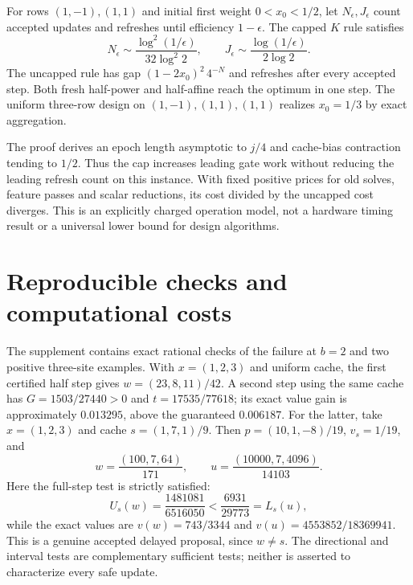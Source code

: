 \documentclass[11pt]{article}
\begin{document}
\begin{proposition}\label{prop:cap-cost}
For rows $(1,-1),(1,1)$ and initial first weight $0<x_0<1/2$, let $N_\epsilon,J_\epsilon$ count accepted updates and refreshes until efficiency $1-\epsilon$. The capped $K$ rule satisfies
\[
 N_\epsilon\sim\frac{\log^2(1/\epsilon)}{32\log^2 2},\qquad
 J_\epsilon\sim\frac{\log(1/\epsilon)}{2\log2}.
\]
The uncapped rule has gap $(1-2x_0)^2\,4^{-N}$ and refreshes after every accepted step. Both fresh half-power and half-affine reach the optimum in one step. The uniform three-row design on $(1,-1),(1,1),(1,1)$ realizes $x_0=1/3$ by exact aggregation.
\end{proposition}
The proof derives an epoch length asymptotic to $j/4$ and cache-bias contraction tending to $1/2$. Thus the cap increases leading gate work without reducing the leading refresh count on this instance. With fixed positive prices for old solves, feature passes and scalar reductions, its cost divided by the uncapped cost diverges. This is an explicitly charged operation model, not a hardware timing result or a universal lower bound for design algorithms.

\section{Reproducible checks and computational costs}
The supplement contains exact rational checks of the failure at $b=2$ and two positive three-site examples. With $x=(1,2,3)$ and uniform cache, the first certified half step gives $w=(23,8,11)/42$. A second step using the same cache has $G=1503/27440>0$ and $t=17535/77618$; its exact value gain is approximately $0.013295$, above the guaranteed $0.006187$.
For the latter, take $x=(1,2,3)$ and cache $s=(1,7,1)/9$.
Then $p=(10,1,-8)/19$, $v_s=1/19$, and
\[
 w=\frac{(100,7,64)}{171},\qquad
 u=\frac{(10000,7,4096)}{14103}.
\]
Here the full-step test is strictly satisfied:
\[
 U_s(w)=\frac{1481081}{6516050}
 <\frac{6931}{29773}=L_s(u),
\]
while the exact values are
$v(w)=743/3344$ and $v(u)=4553852/18369941$.
This is a genuine accepted delayed proposal, since $w\ne s$.
The directional and interval tests are complementary sufficient tests; neither is asserted to characterize every safe update.
\end{document}
